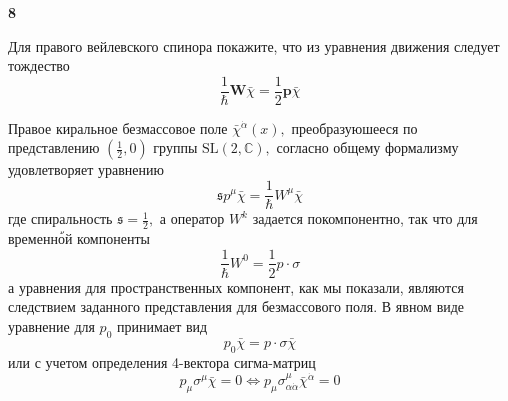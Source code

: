 \documentclass[a4paper,12pt]{article} %
\begin{document}
\begin{ttask}\textbf{8}


Для правого вейлевского спинора покажите, что из уравнения движения следует тождество
$$
\frac{1}{\hbar} \boldsymbol{W} \bar{\chi}=\frac{1}{2} \boldsymbol{p} \bar{\chi}
$$


Правое киральное безмассовое поле $\bar{\chi}^{\dot{\alpha}}(x),$ преобразуюшееся по представлению $\left(\frac{1}{2}, 0\right)$ группы $\mathrm{SL}(2, \mathbb{C}),$ согласно общему формализму удовлетворяет уравнению
$$
\mathfrak{s} p^{\mu} \bar{\chi}=\frac{1}{\hbar} W^{\mu} \bar{\chi}
$$
где спиральность $\mathfrak{s}=\frac{1}{2},$ а оператор $W^{k}$ задается покомпонентно, так что для временно้й компоненты
$$
\frac{1}{\hbar} W^{0}=\frac{1}{2} p \cdot \sigma
$$
а уравнения для пространственных компонент, как мы показали, являются следствием заданного представления для безмассового поля. В явном виде уравнение для $p_{0}$ принимает вид
$$
p_{0} \bar{\chi}=p \cdot \sigma \bar{\chi}
$$
или с учетом определения 4-вектора сигма-матриц
$$
p_{\mu} \sigma^{\mu} \bar{\chi}=0 \Leftrightarrow p_{\mu} \sigma_{\alpha \dot{\alpha}}^{\mu} \bar{\chi}^{\dot{\alpha}}=0
$$

















\end{ttask}
\end{document}
